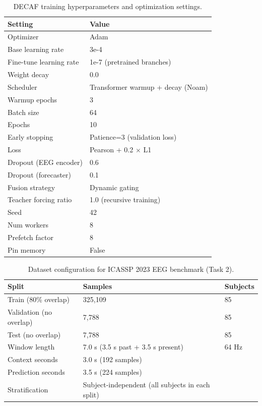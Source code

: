 \begin{table}[t]
\centering
\caption{DECAF training hyperparameters and optimization settings.}
\label{tab:decaf_hyperparams}
\begin{tabular}{ll}
\toprule
\textbf{Setting} & \textbf{Value} \\
\midrule
Optimizer & Adam \\
Base learning rate & 3e-4 \\
Fine-tune learning rate & 1e-7 (pretrained branches) \\
Weight decay & 0.0 \\
Scheduler & Transformer warmup + decay (Noam) \\
Warmup epochs & 3 \\
Batch size & 64 \\
Epochs & 10 \\
Early stopping & Patience=3 (validation loss) \\
Loss & Pearson + 0.2 $\times$ L1 \\
Dropout (EEG encoder) & 0.6 \\
Dropout (forecaster) & 0.1 \\
Fusion strategy & Dynamic gating \\
Teacher forcing ratio & 1.0 (recursive training) \\
Seed & 42 \\
Num workers & 8 \\
Prefetch factor & 8 \\
Pin memory & False \\
\bottomrule
\end{tabular}
\end{table}

\begin{table}[t]
\centering
\caption{Dataset configuration for ICASSP 2023 EEG benchmark (Task 2).}
\label{tab:decaf_dataset}
\begin{tabular}{lll}
\toprule
\textbf{Split} & \textbf{Samples} & \textbf{Subjects} \\
\midrule
Train (80\% overlap) & 325,109 & 85 \\
Validation (no overlap) & 7,788 & 85 \\
Test (no overlap) & 7,788 & 85 \\
\midrule
Window length & 7.0 s (3.5 s past + 3.5 s present) & 64 Hz \\
Context seconds & 3.0 s (192 samples) & \\
Prediction seconds & 3.5 s (224 samples) & \\
Stratification & Subject-independent (all subjects in each split) & \\
\bottomrule
\end{tabular}
\end{table}
